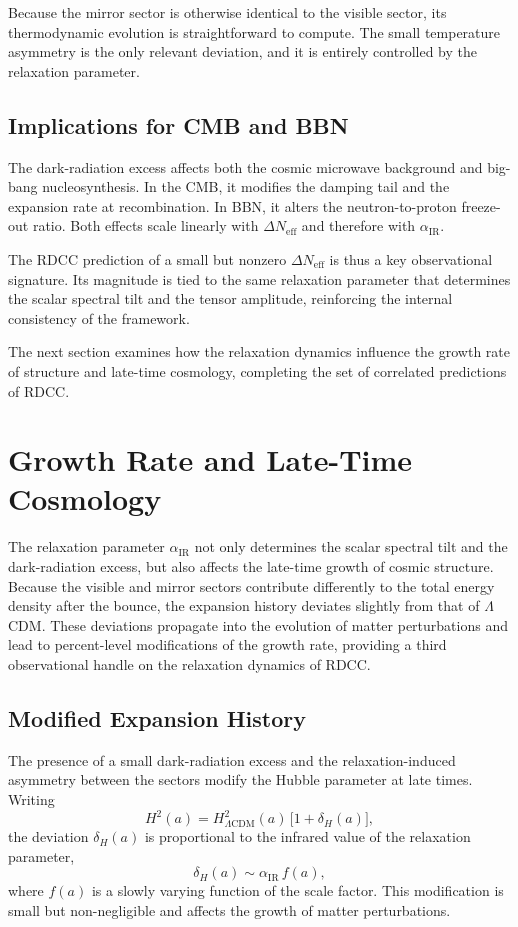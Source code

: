 \documentclass[11pt,a4paper]{article}
\begin{document}
Because the mirror sector is otherwise identical to the visible sector, its thermodynamic
evolution is straightforward to compute. The small temperature asymmetry is the only
relevant deviation, and it is entirely controlled by the relaxation parameter.

\subsection{Implications for CMB and BBN}

The dark-radiation excess affects both the cosmic microwave background and
big-bang nucleosynthesis. In the CMB, it modifies the damping tail and the expansion
rate at recombination. In BBN, it alters the neutron-to-proton freeze-out ratio. Both
effects scale linearly with $\Delta N_{\mathrm{eff}}$ and therefore with $\alpha_{\mathrm{IR}}$.

The RDCC prediction of a small but nonzero $\Delta N_{\mathrm{eff}}$ is thus a key
observational signature. Its magnitude is tied to the same relaxation parameter that
determines the scalar spectral tilt and the tensor amplitude, reinforcing the internal
consistency of the framework.

The next section examines how the relaxation dynamics influence the growth rate of
structure and late-time cosmology, completing the set of correlated predictions of RDCC.

\section{Growth Rate and Late-Time Cosmology}

The relaxation parameter $\alpha_{\mathrm{IR}}$ not only determines the scalar spectral tilt and
the dark-radiation excess, but also affects the late-time growth of cosmic structure.
Because the visible and mirror sectors contribute differently to the total energy density
after the bounce, the expansion history deviates slightly from that of $\Lambda$CDM.
These deviations propagate into the evolution of matter perturbations and lead to
percent-level modifications of the growth rate, providing a third observational handle
on the relaxation dynamics of RDCC.

\subsection{Modified Expansion History}

The presence of a small dark-radiation excess and the relaxation-induced asymmetry
between the sectors modify the Hubble parameter at late times. Writing
\begin{equation}
    H^2(a)
    = H^2_{\Lambda\mathrm{CDM}}(a)\,\bigl[1 + \delta_H(a)\bigr],
\end{equation}
the deviation $\delta_H(a)$ is proportional to the infrared value of the relaxation
parameter,
\begin{equation}
    \delta_H(a) \sim \alpha_{\mathrm{IR}}\, f(a),
\end{equation}
where $f(a)$ is a slowly varying function of the scale factor. This modification is small
but non-negligible and affects the growth of matter perturbations.
\end{document}
